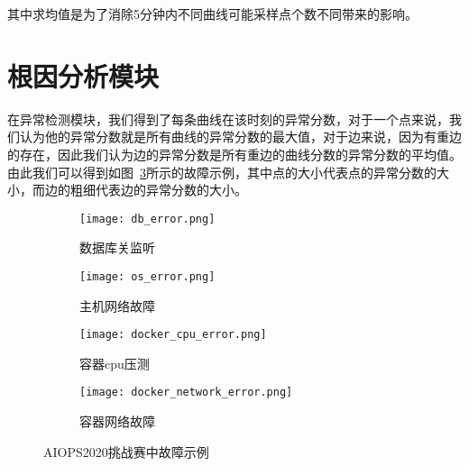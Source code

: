 其中求均值是为了消除5分钟内不同曲线可能采样点个数不同带来的影响。
\section{根因分析模块}
在异常检测模块，我们得到了每条曲线在该时刻的异常分数，对于一个点来说，我们认为他的异常分数就是所有曲线的异常分数的最大值，对于边来说，因为有重边的存在，因此我们认为边的异常分数是所有重边的曲线分数的异常分数的平均值。由此我们可以得到如图~\ref{fig:error:example}所示的故障示例，其中点的大小代表点的异常分数的大小，而边的粗细代表边的异常分数的大小。
\begin{figure}[htbp]
  \centering
  \begin{subfigure}[b]{\textwidth}
    \begin{minipage}[t]{0.5\linewidth}
      \centering
      \texttt{[image: db\_error.png]}
      \caption{数据库关监听}
      \label{fig:error:db}
    \end{minipage}
    \begin{minipage}[t]{0.5\linewidth}
      \centering
      \texttt{[image: os\_error.png]}
      \caption{主机网络故障}
      \label{fig:error:os}
    \end{minipage}
  \end{subfigure}

  \begin{subfigure}[b]{\textwidth}
    \begin{minipage}[t]{0.5\linewidth}
      \centering
      \texttt{[image: docker\_cpu\_error.png]}
      \caption{容器cpu压测}
      \label{fig:error:db}
    \end{minipage}
    \begin{minipage}[t]{0.5\linewidth}
      \centering
      \texttt{[image: docker\_network\_error.png]}
      \caption{容器网络故障}
      \label{fig:error:os}
    \end{minipage}
  \end{subfigure}
  \caption{AIOPS2020挑战赛中故障示例}
  \label{fig:error:example}
\end{figure}
